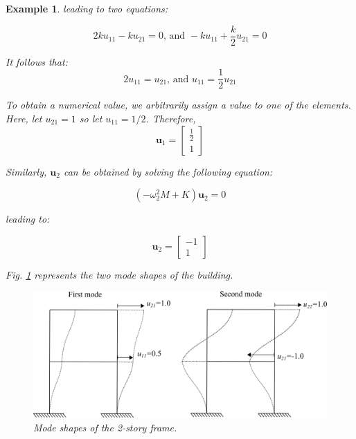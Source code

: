 \documentclass[12pt,letter]{article}
\newtheorem{ex}{Example}
\numberwithin{ex}{section} %
\newenvironment{example}{\begin{mdframed}[middlelinewidth=0.5mm]\begin{ex}\normalfont}{\end{ex}\end{mdframed}}
\numberwithin{re}{section} %
\begin{document}
\begin{example}
\noindent leading to two equations:

\begin{equation}
2 k u_{11} -k u_{21}=0 \text{, and } -k u_{11} + \frac{k}{2} u_{21}=0
\end{equation}

\noindent It follows that:
\begin{equation}
2 u_{11}= u_{21}  \text{, and } u_{11} = \frac{1}{2}u_{21}
\end{equation}

\noindent To obtain a numerical value, we arbitrarily assign a value to one of the elements. Here, let $u_{21}=1$ so let $u_{11}=1/2$. Therefore, 
\begin{equation}
\textbf{u}_1 = \begin{bmatrix} \frac{1}{2}\\ 1\end{bmatrix}
\end{equation}

\noindent Similarly, $\mathbf{u}_2$ can be obtained by solving the following equation:

\begin{equation}
(-\omega_2^2 M  + K)\mathbf{u}_2 =0
\end{equation}

\noindent leading to:

\begin{equation}
	\textbf{u}_2 = \begin{bmatrix} -1\\ 1\end{bmatrix}
\end{equation}

\noindent Fig. \ref{fig:modeshapes} represents the two mode shapes of the building. 

\vspace{4ex}

\begin{figure}[H]
	\centering
	\includegraphics{../figures/two_story_frame_example_mode_shapes.png}
	\caption{Mode shapes of the 2-story frame.}
	\label{fig:modeshapes}
\end{figure}


\end{example}
\end{document}
